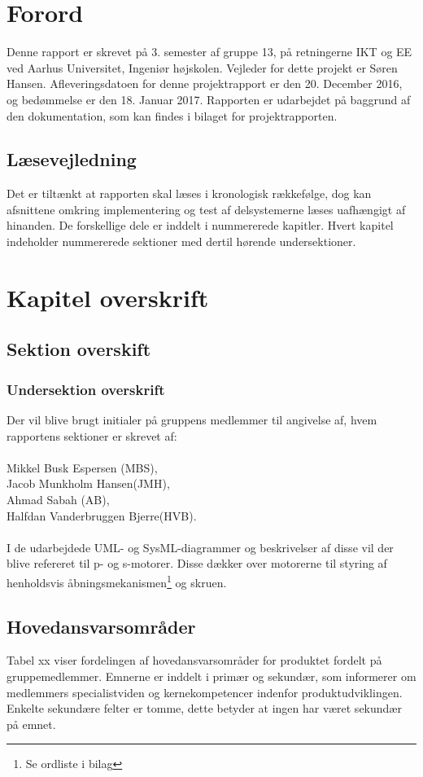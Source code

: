 \chapter{Forord}
Denne rapport er skrevet på 3. semester af gruppe 13, på retningerne IKT og EE ved Aarhus Universitet, Ingeniør højskolen. 
Vejleder for dette projekt er Søren Hansen. Afleveringsdatoen for denne projektrapport er den 20. December 2016, og bedømmelse er den 18. Januar 2017.
Rapporten er udarbejdet på baggrund af den dokumentation, som kan findes i bilaget for projektrapporten.

\section{Læsevejledning}
Det er tiltænkt at rapporten skal læses i kronologisk rækkefølge, dog kan afsnittene omkring implementering og test af delsystemerne læses
uafhængigt af hinanden. De forskellige dele er inddelt i nummererede kapitler. Hvert kapitel indeholder nummererede sektioner med dertil hørende undersektioner. \\

\chapter{Kapitel overskrift}
\section{Sektion overskift}
\subsection{Undersektion overskrift}

\noindent
Der vil blive brugt initialer på gruppens medlemmer til angivelse af, hvem rapportens sektioner er skrevet af: \\
\\
Mikkel Busk Espersen (MBS), \\
Jacob Munkholm Hansen(JMH), \\
Ahmad Sabah (AB), \\
Halfdan Vanderbruggen Bjerre(HVB). \\
\\
I de udarbejdede UML- og SysML-diagrammer og beskrivelser af disse vil der blive refereret til p- og s-motorer. Disse dækker over motorerne til styring af 
henholdsvis åbningsmekanismen\footnote{Se ordliste i bilag} og skruen.

\section{Hovedansvarsområder}
Tabel xx viser fordelingen af hovedansvarsområder for produktet fordelt på gruppemedlemmer. Emnerne er inddelt i primær og sekundær, som informerer om 
medlemmers specialistviden og kernekompetencer indenfor produktudviklingen. Enkelte sekundære felter er tomme, dette betyder at ingen har været sekundær på 
emnet.\\

